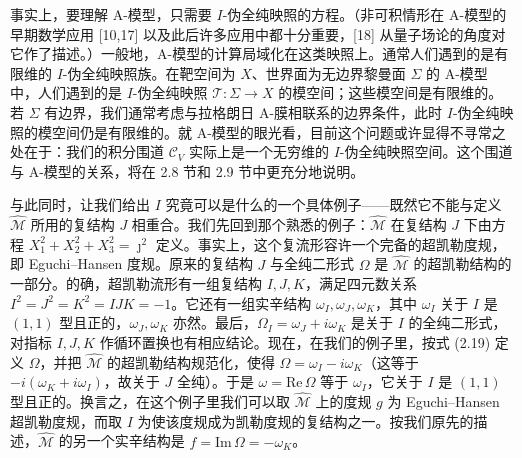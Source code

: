 \documentclass[11pt,a4paper,UTF8]{ctexart}
\theoremstyle{plain}
\theoremstyle{definition}
\begin{document}
事实上，要理解 A-模型，只需要 $I$-伪全纯映照的方程。（非可积情形在 A-模型的早期数学应用 [10,17] 以及此后许多应用中都十分重要，[18] 从量子场论的角度对它作了描述。）一般地，A-模型的计算局域化在这类映照上。通常人们遇到的是有限维的 $I$-伪全纯映照族。在靶空间为 $X$、世界面为无边界黎曼面 $\Sigma$ 的 A-模型中，人们遇到的是 $I$-伪全纯映照 $\mathcal{T}:\Sigma\to X$ 的模空间；这些模空间是有限维的。若 $\Sigma$ 有边界，我们通常考虑与拉格朗日 A-膜相联系的边界条件，此时 $I$-伪全纯映照的模空间仍是有限维的。就 A-模型的眼光看，目前这个问题或许显得不寻常之处在于：我们的积分围道 $\mathcal{C}_V$ 实际上是一个无穷维的 $I$-伪全纯映照空间。这个围道与 A-模型的关系，将在 2.8 节和 2.9 节中更充分地说明。


与此同时，让我们给出 $I$ 究竟可以是什么的一个具体例子——既然它不能与定义 $\widehat{\mathcal{M}}$ 所用的复结构 $J$ 相重合。我们先回到那个熟悉的例子：$\widehat{\mathcal{M}}$ 在复结构 $J$ 下由方程 $X_1^2+X_2^2+X_3^2=\jmath^2$ 定义。事实上，这个复流形容许一个完备的超凯勒度规，即 Eguchi--Hansen 度规。原来的复结构 $J$ 与全纯二形式 $\Omega$ 是 $\widehat{\mathcal{M}}$ 的超凯勒结构的一部分。的确，超凯勒流形有一组复结构 $I,J,K$，满足四元数关系 $I^2=J^2=K^2=IJK=-1$。它还有一组实辛结构 $\omega_I,\omega_J,\omega_K$，其中 $\omega_I$ 关于 $I$ 是 $(1,1)$ 型且正的，$\omega_J,\omega_K$ 亦然。最后，$\Omega_I=\omega_J+i\omega_K$ 是关于 $I$ 的全纯二形式，对指标 $I,J,K$ 作循环置换也有相应结论。现在，在我们的例子里，按式 (2.19) 定义 $\Omega$，并把 $\widehat{\mathcal{M}}$ 的超凯勒结构规范化，使得 $\Omega=\omega_I-i\omega_K$（这等于 $-i(\omega_K+i\omega_I)$，故关于 $J$ 全纯）。于是 $\omega=\mathrm{Re}\,\Omega$ 等于 $\omega_I$，它关于 $I$ 是 $(1,1)$ 型且正的。换言之，在这个例子里我们可以取 $\widehat{\mathcal{M}}$ 上的度规 $g$ 为 Eguchi--Hansen 超凯勒度规，而取 $I$ 为使该度规成为凯勒度规的复结构之一。按我们原先的描述，$\widehat{\mathcal{M}}$ 的另一个实辛结构是 $f=\mathrm{Im}\,\Omega=-\omega_K$。

\end{document}
